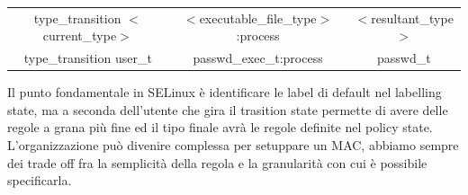 \documentclass[12pt, oneside]{extbook} %
\begin{document}
\begin{table}[!h]
	\begin{tabular}{c c c}
		type\_transition $<$current\_type$>$ & $<$executable\_file\_type$>$:process & $<$resultant\_type$>$\\
		type\_transition user\_t & passwd\_exec\_t:process & passwd\_t\\
	\end{tabular}
\end{table}
Il punto fondamentale in SELinux è identificare le label di default nel labelling state, ma a seconda dell'utente che gira il trasition state permette di avere delle regole a grana più fine ed il tipo finale avrà le regole definite nel policy state.\\L'organizzazione può divenire complessa per setuppare un MAC, abbiamo sempre dei trade off fra la semplicità della regola e la granularità con cui è possibile specificarla.
\end{document}

